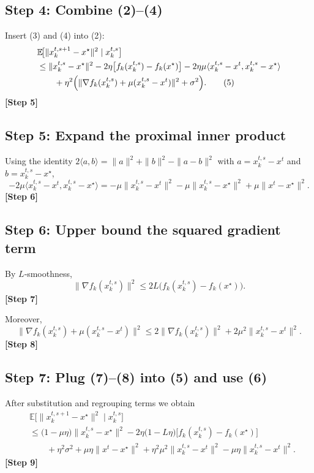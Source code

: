 \documentclass[11pt]{article}
\begin{document}
\subsection*{Step 4: Combine (2)–(4)}
Insert (3) and (4) into (2):
\begin{align}
    &\mathbb{E}\!\bigl[\|x_{k}^{t,s+1}-x^{\star}\|^{2}\mid x_{k}^{t,s}\bigr]\nonumber\\
    &\le \|x_{k}^{t,s}-x^{\star}\|^{2}
       -2\eta\bigl[f_k(x_{k}^{t,s})-f_k(x^{\star})\bigr]
       -2\eta\mu\langle x_{k}^{t,s}-x^{t},x_{k}^{t,s}-x^{\star}\rangle \nonumber\\
    &\qquad +\eta^{2}\Bigl(\|\nabla f_k(x_{k}^{t,s})+\mu(x_{k}^{t,s}-x^{t})\|^{2}+\sigma^{2}\Bigr). \tag{5}
\end{align}
\textbf{[Step 5]}

\subsection*{Step 5: Expand the proximal inner product}
Using the identity $2\langle a,b\rangle = \|a\|^{2}+\|b\|^{2}-\|a-b\|^{2}$ with
$a=x_{k}^{t,s}-x^{t}$ and $b=x_{k}^{t,s}-x^{\star}$,
\[
    -2\mu\langle x_{k}^{t,s}-x^{t},x_{k}^{t,s}-x^{\star}\rangle
    = -\mu\|x_{k}^{t,s}-x^{t}\|^{2}
      -\mu\|x_{k}^{t,s}-x^{\star}\|^{2}
      +\mu\|x^{t}-x^{\star}\|^{2}. \tag{6}
\]
\textbf{[Step 6]}

\subsection*{Step 6: Upper bound the squared gradient term}
By $L$‑smoothness,
\[
    \|\nabla f_k(x_{k}^{t,s})\|^{2}\le 2L\bigl(f_k(x_{k}^{t,s})-f_k(x^{\star})\bigr). \tag{7}
\]
\textbf{[Step 7]}

Moreover,
\[
    \|\nabla f_k(x_{k}^{t,s})+\mu(x_{k}^{t,s}-x^{t})\|^{2}
    \le 2\|\nabla f_k(x_{k}^{t,s})\|^{2}+2\mu^{2}\|x_{k}^{t,s}-x^{t}\|^{2}. \tag{8}
\]
\textbf{[Step 8]}

\subsection*{Step 7: Plug (7)–(8) into (5) and use (6)}
After substitution and regrouping terms we obtain
\begin{align}
    &\mathbb{E}\!\bigl[\|x_{k}^{t,s+1}-x^{\star}\|^{2}\mid x_{k}^{t,s}\bigr]\nonumber\\
    &\le \bigl(1-\mu\eta\bigr)\|x_{k}^{t,s}-x^{\star}\|^{2}
       -2\eta\bigl(1-L\eta\bigr)\bigl[f_k(x_{k}^{t,s})-f_k(x^{\star})\bigr]\nonumber\\
    &\qquad +\eta^{2}\sigma^{2}
       +\mu\eta\|x^{t}-x^{\star}\|^{2}
       +\eta^{2}\mu^{2}\|x_{k}^{t,s}-x^{t}\|^{2}
       -\mu\eta\|x_{k}^{t,s}-x^{t}\|^{2}. \tag{9}
\end{align}
\textbf{[Step 9]}
\end{document}
